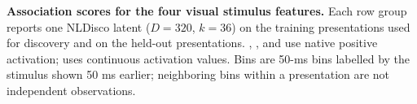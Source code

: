 \begin{table}[!htbp]
    \centering
    {\small\setlength{\tabcolsep}{3pt}\renewcommand{\arraystretch}{1.12}
    }
    \caption{\textbf{Association scores for the four visual stimulus features.} Each row group reports one NLDisco latent ($D=320$, $k=36$) on the training presentations used for discovery and on the held-out presentations. , , and  use native positive activation;  uses continuous activation values. Bins are 50-ms bins labelled by the stimulus shown 50 ms earlier; neighboring bins within a presentation are not independent observations.}
    \label{table:rebuttal_allen_metrics}
\end{table}
